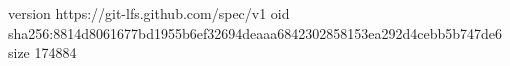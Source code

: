 version https://git-lfs.github.com/spec/v1
oid sha256:8814d8061677bd1955b6ef32694deaaa6842302858153ea292d4cebb5b747de6
size 174884
